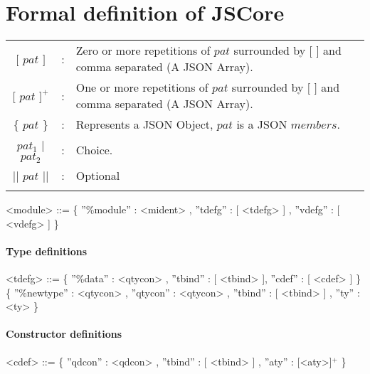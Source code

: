 
\section{Formal definition of JSCore}
\label{jscoregrammar}


\begin{scriptsize}
\leavevmode
\begin{longtable}{ c c l }


$[$ $pat$ $]$ 		& : 	& Zero or more repetitions of $pat$ surrounded by $[$ $]$ and comma separated (A JSON Array). 	\\
$[$ $pat$ $]^{+}$ 	& : 	& One or more repetitions of $pat$ surrounded by $[$ $]$ and comma separated (A JSON Array). 	\\ 
$\{$ $pat$ $\}$		& :	& Represents a JSON Object, $pat$ is a JSON $members$.						\\
$pat_{1}$ $|$ $pat_{2}$	& :	& Choice.											\\
$||$ $pat$ $||$ 	& :	& Optional											\\
\\[0.01in]

\end{longtable}



\begin{grammar}
<module> 	::= \{ ''\%module'' : <mident> , ''tdefg'' : [ <tdefg> ] , ''vdefg'' : [ <vdefg> ] \}
\end{grammar}

\paragraph{Type definitions}

\begin{grammar}
<tdefg> 	  ::= 	 \{ ''\%data'' : <qtycon> , ''tbind'' : [ <tbind> ], ''cdef'' : [ <cdef> ] \}						
		  \alt 	 \{ ''\%newtype'' : <qtycon> , ''qtycon'' : <qtycon> , ''tbind'' : [ <tbind> ] , ''ty'' : <ty> \} 	

\end{grammar}

\paragraph{Constructor definitions}

\begin{grammar}


<cdef>		  ::= 	 \{ ''qdcon'' : <qdcon> , ''tbind'' : [ <tbind>  ] , ''aty'' : [<aty>]$^{+}$ \} 				 			


\end{grammar}
\end{scriptsize}
